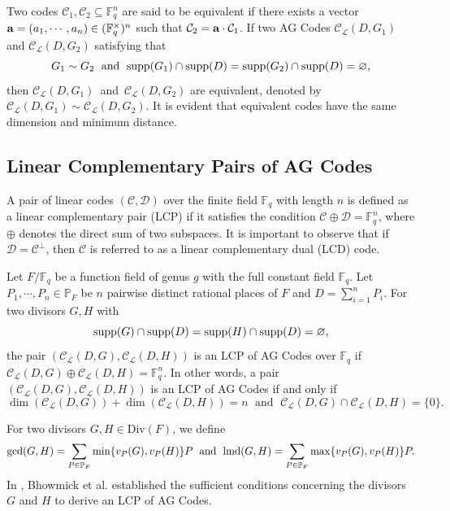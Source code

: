 \documentclass[journal,12pt,onecolumn]{IEEEtran}
\begin{document}
Two codes $\mathcal{C}_1,\mathcal{C}_2\subseteq\mathbb{F}_q^n$ are said to be equivalent if there exists a vector ${\bf a}=(a_1,\cdots,a_n)\in(\mathbb{F}_q^\times)^n$ such that $\mathcal{C}_2 = {\bf a}\cdot \mathcal{C}_1$. If two AG Codes $\mathcal{C}_{\mathcal{L}}(D,G_1)$ and $\mathcal{C}_{\mathcal{L}}(D,G_2)$ satisfying that
\[
    G_1\sim G_2 \;\text{ and }\;{\rm{supp}}(G_1)\cap {\rm{supp}}(D)={\rm{supp}}(G_2)\cap {\rm{supp}}(D)=\varnothing,
\]
then $\mathcal{C}_{\mathcal{L}}(D,G_1)\,$ and $\,\mathcal{C}_{\mathcal{L}}(D,G_2)$ are equivalent, denoted by $\mathcal{C}_{\mathcal{L}}(D,G_1)\sim \mathcal{C}_{\mathcal{L}}(D,G_2)$. It is evident that equivalent codes have the same dimension and minimum distance. 


\subsection{Linear Complementary Pairs of AG Codes}


A pair of linear codes $(\mathcal{C},\mathcal{D})$ over the finite field $\mathbb{F}_q$ with length $n$ is defined as a linear complementary pair (LCP) if it satisfies the condition $\mathcal{C}\oplus\mathcal{D}=\mathbb{F}_q^n$, where $\oplus$ denotes the direct sum of two subspaces. It is important to observe that if $\mathcal{D}=\mathcal{C}^\bot$, then $\mathcal{C}$ is referred to as a linear complementary dual (LCD) code. 

Let $F/\mathbb{F}_q$ be a function field of genus $g$ with the full constant field $\mathbb{F}_q$. Let $P_1,\cdots,P_n\in\mathbb{P}_F$ be $n$ pairwise distinct rational places of $F$ and $D=\sum_{i=1}^nP_i$. For two divisors $G,H$ with 
\[
    {\rm{supp}}(G)\cap {\rm{supp}}(D)={\rm{supp}}(H)\cap {\rm{supp}}(D)=\varnothing,
\]
the pair $(\mathcal{C}_{\mathcal{L}}(D,G),\mathcal{C}_{\mathcal{L}}(D,H))$ is an LCP of AG Codes over $\mathbb{F}_q$ if $\mathcal{C}_{\mathcal{L}}(D,G)\oplus\mathcal{C}_{\mathcal{L}}(D,H)=\mathbb{F}_q^n$. In other words, a pair $(\mathcal{C}_{\mathcal{L}}(D,G),\mathcal{C}_{\mathcal{L}}(D,H))$ is an LCP of AG Codes if and only if 
\[
    \dim (\mathcal{C}_{\mathcal{L}}(D,G))+\dim (\mathcal{C}_{\mathcal{L}}(D,H)) = n\; \text{ and }\; \mathcal{C}_{\mathcal{L}}(D,G)\cap\mathcal{C}_{\mathcal{L}}(D,H)=\{0\}. 
\]

For two divisors $G,H\in\text{Div}(F)$, we define 
\[
    \gcd(G,H) = \sum_{P\in\mathbb{P}_F}\min\{v_P(G),v_P(H)\}P\;\text{ and }\;{\rm lmd}(G,H) = \sum_{P\in\mathbb{P}_F}\max\{v_P(G),v_P(H)\}P. 
\]
In \cite{On_linear_complementary_pairs_of_algebraic_geometry_codes}, Bhowmick et al. established the sufficient conditions concerning the divisors $G$ and $H$ to derive an LCP of AG Codes.
\end{document}
